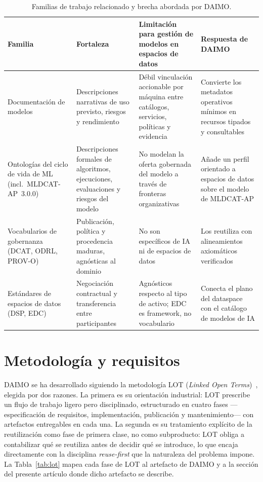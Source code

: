 \documentclass[11pt,a4paper]{article}
\begin{document}
\begin{table}[t]
\caption{Familias de trabajo relacionado y brecha abordada por DAIMO.}
\label{tab:related}
\centering
\small
\begin{tabularx}{\textwidth}{@{}L{3cm}XXX@{}}
\toprule
\textbf{Familia} & \textbf{Fortaleza} & \textbf{Limitación para gestión de modelos en espacios de datos} & \textbf{Respuesta de DAIMO} \\
\midrule
Documentación de modelos &
Descripciones narrativas de uso previsto, riesgos y rendimiento &
Débil vinculación accionable por máquina entre catálogos, servicios, políticas y evidencia &
Convierte los metadatos operativos mínimos en recursos tipados y consultables \\[0.4em]

Ontologías del ciclo de vida de ML (incl.\ MLDCAT-AP~3.0.0) &
Descripciones formales de algoritmos, ejecuciones, evaluaciones y riesgos del modelo &
No modelan la oferta gobernada del modelo a través de fronteras organizativas &
Añade un perfil orientado a espacios de datos sobre el modelo de MLDCAT-AP \\[0.4em]

Vocabularios de gobernanza (DCAT, ODRL, PROV-O) &
Publicación, política y procedencia maduras, agnósticas al dominio &
No son específicos de IA ni de espacios de datos &
Los reutiliza con alineamientos axiomáticos verificados \\[0.4em]

Estándares de espacios de datos (DSP, EDC) &
Negociación contractual y transferencia entre participantes &
Agnósticos respecto al tipo de activo; EDC es framework, no vocabulario &
Conecta el plano del dataspace con el catálogo de modelos de IA \\
\bottomrule
\end{tabularx}
\end{table}

\section{Metodología y requisitos}\label{sec:method}

DAIMO se ha desarrollado siguiendo la metodología LOT (\emph{Linked Open Terms})~\cite{lot22}, elegida por dos razones. La primera es su orientación industrial: LOT prescribe un flujo de trabajo ligero pero disciplinado, estructurado en cuatro fases ---especificación de requisitos, implementación, publicación y mantenimiento--- con artefactos entregables en cada una. La segunda es su tratamiento explícito de la reutilización como fase de primera clase, no como subproducto: LOT obliga a contabilizar qué se reutiliza antes de decidir qué se introduce, lo que encaja directamente con la disciplina \emph{reuse-first} que la naturaleza del problema impone. La Tabla~\ref{tab:lot} mapea cada fase de LOT al artefacto de DAIMO y a la sección del presente artículo donde dicho artefacto se describe.
\end{document}
